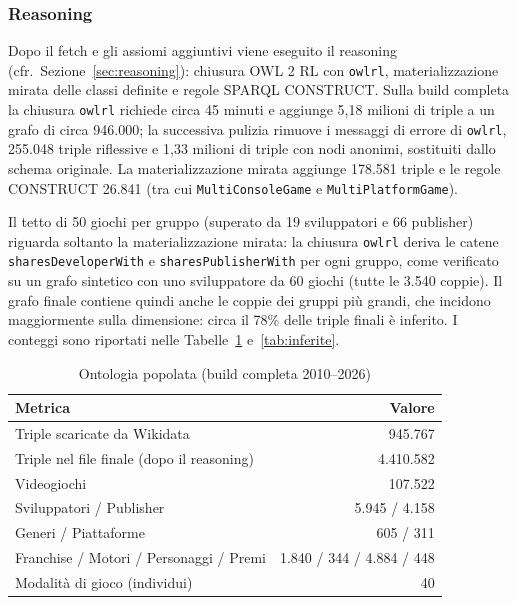 \subsubsection{Reasoning}

Dopo il fetch e gli assiomi aggiuntivi viene eseguito il reasoning (cfr.\ Sezione~\ref{sec:reasoning}):
chiusura OWL 2 RL con \texttt{owlrl}, materializzazione mirata delle classi definite e regole SPARQL
CONSTRUCT. Sulla build completa la chiusura \texttt{owlrl} richiede circa 45 minuti e aggiunge 5,18 milioni
di triple a un grafo di circa 946.000; la successiva pulizia rimuove i messaggi di errore di \texttt{owlrl},
255.048 triple riflessive e 1,33 milioni di triple con nodi anonimi, sostituiti dallo schema originale. La
materializzazione mirata aggiunge 178.581 triple e le regole CONSTRUCT 26.841 (tra cui \texttt{MultiConsoleGame}
e \texttt{MultiPlatformGame}).

Il tetto di 50 giochi per gruppo (superato da 19 sviluppatori e 66 publisher) riguarda soltanto la
materializzazione mirata: la chiusura \texttt{owlrl} deriva le catene \texttt{sharesDeveloperWith} e
\texttt{sharesPublisherWith} per ogni gruppo, come verificato su un grafo sintetico con uno sviluppatore da
60 giochi (tutte le 3.540 coppie). Il grafo finale contiene quindi anche le coppie dei gruppi pi\`u grandi,
che incidono maggiormente sulla dimensione: circa il 78\% delle triple finali \`e inferito. I conteggi sono
riportati nelle Tabelle~\ref{tab:abox} e~\ref{tab:inferite}.

\begin{table}[h]
\centering
\caption{Ontologia popolata (build completa 2010--2026)}
\label{tab:abox}
\small
\begin{tabular}{lr}
\toprule
\textbf{Metrica} & \textbf{Valore} \\
\midrule
Triple scaricate da Wikidata & 945.767 \\
Triple nel file finale (dopo il reasoning) & 4.410.582 \\
Videogiochi & 107.522 \\
Sviluppatori / Publisher & 5.945 / 4.158 \\
Generi / Piattaforme & 605 / 311 \\
Franchise / Motori / Personaggi / Premi & 1.840 / 344 / 4.884 / 448 \\
Modalit\`a di gioco (individui) & 40 \\
\bottomrule
\end{tabular}
\end{table}

